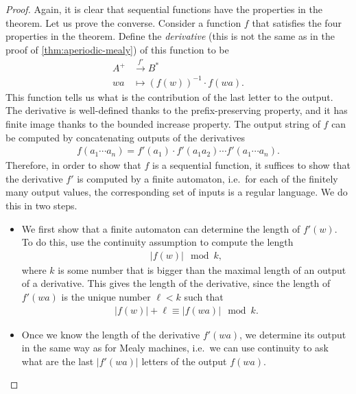 \begin{proof}
    Again, it is clear that sequential functions have the properties in the theorem. Let us prove the converse. Consider a function $f$ that satisfies the four properties in the theorem. Define the \emph{derivative} (this is not the same as in the proof of \cref{thm:aperiodic-mealy}) of this function to be 
\begin{align*}
     A^+ & \xrightarrow{f'} B^*  \\
     wa & \mapsto (f(w))^{-1} \cdot f(wa).
\end{align*}
This function tells us what is the contribution of the last letter to the output. The derivative is well-defined thanks to the prefix-preserving property, and it has finite image thanks to the bounded increase property. The output string of $f$ can be computed by concatenating outputs of the derivatives
\begin{align*}
f(a_1 \cdots a_n) = f'(a_1) \cdot f'(a_1 a_2) \cdots f'(a_1 \cdots a_n).
\end{align*}
Therefore, in order to show that $f$ is a sequential function, it suffices to show that the derivative $f'$ is computed by a finite automaton, i.e.~for each of the  finitely many output values, the corresponding set of inputs is a regular language. We do this in two steps.
\begin{itemize}
    \item  We first show that a finite automaton can determine the length of $f'(w)$. To do this, use the continuity assumption to compute the length
    \begin{align*}
    |f(w)| \mod k,
    \end{align*}
    where $k$ is some number that is bigger than the maximal length of an output of a derivative. This gives the length of the derivative, since the length of $f'(wa)$ is the unique number $\ell < k$ such that
\begin{align*}
    |f(w)| + \ell \equiv |f(wa)| \mod k.
\end{align*}
\item Once we know the length  of the derivative $f'(wa)$, we determine its output in the same way as for Mealy machines, i.e.~we can use continuity to ask what are the last $|f'(wa)|$ letters of the output $f(wa)$. 

\end{itemize}
\end{proof}

